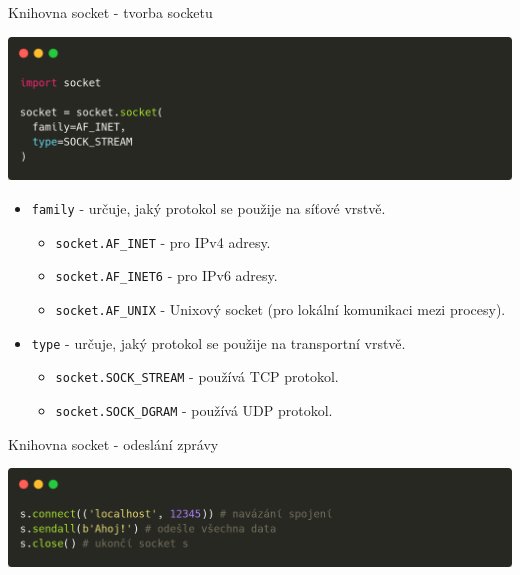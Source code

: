 \documentclass{beamer}
\begin{document}
\begin{frame}{Knihovna socket - tvorba socketu}
    \begin{center}
        \includegraphics[width=\textwidth]{obrazky/codes/carbon10.png}
    \end{center}
	\begin{itemize}
		\item \texttt{family}  - určuje, jaký protokol se použije na síťové vrstvě.
		\begin{itemize}
			\item \texttt{socket.AF\_INET} - pro IPv4 adresy.
			\item \texttt{socket.AF\_INET6} - pro IPv6 adresy.
			\item \texttt{socket.AF\_UNIX} - Unixový socket (pro lokální komunikaci mezi procesy).
		\end{itemize}
		\item \texttt{type} - určuje, jaký protokol se použije na transportní vrstvě.
		\begin{itemize}
			\item \texttt{socket.SOCK\_STREAM} - používá TCP protokol.
			\item \texttt{socket.SOCK\_DGRAM} - používá UDP protokol.
		\end{itemize}
	\end{itemize}
\end{frame}

\begin{frame}{Knihovna socket - odeslání zprávy}
    \begin{center}
        \includegraphics[width=\textwidth]{obrazky/codes/carbon11.png}
    \end{center}
\end{frame}
\end{document}
